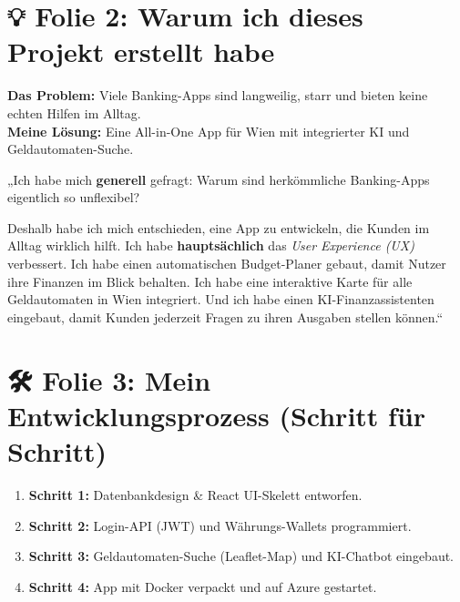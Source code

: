 \documentclass[11pt,a4paper]{article}
\begin{document}
\vspace{1cm}

\section{💡 Folie 2: Warum ich dieses Projekt erstellt habe}

\begin{tcolorbox}[colback=bglight, colframe=slideorange, title=\textbf{\color{white}Visualisierung auf Folie 2}, arc=4pt]
\textbf{Das Problem:} Viele Banking-Apps sind langweilig, starr und bieten keine echten Hilfen im Alltag. \\
\textbf{Meine Lösung:} Eine All-in-One App für Wien mit integrierter KI und Geldautomaten-Suche.
\end{tcolorbox}

\begin{tcolorbox}[colback=white, colframe=primarynavy, title=\textbf{Mein Sprechtext (Ich-Form)}]
„Ich habe mich \textbf{generell} gefragt: Warum sind herkömmliche Banking-Apps eigentlich so unflexibel? 

Deshalb habe ich mich entschieden, eine App zu entwickeln, die Kunden im Alltag wirklich hilft. Ich habe \textbf{hauptsächlich} das \textit{User Experience (UX)} verbessert. Ich habe einen automatischen Budget-Planer gebaut, damit Nutzer ihre Finanzen im Blick behalten. Ich habe eine interaktive Karte für alle Geldautomaten in Wien integriert. Und ich habe einen KI-Finanzassistenten eingebaut, damit Kunden jederzeit Fragen zu ihren Ausgaben stellen können.“
\end{tcolorbox}

\newpage

\section{🛠️ Folie 3: Mein Entwicklungsprozess (Schritt für Schritt)}

\begin{tcolorbox}[colback=bglight, colframe=slidegreen, title=\textbf{\color{white}Visualisierung auf Folie 3}, arc=4pt]
\begin{enumerate}
    \item \textbf{Schritt 1:} Datenbankdesign \& React UI-Skelett entworfen.
    \item \textbf{Schritt 2:} Login-API (JWT) und Währungs-Wallets programmiert.
    \item \textbf{Schritt 3:} Geldautomaten-Suche (Leaflet-Map) und KI-Chatbot eingebaut.
    \item \textbf{Schritt 4:} App mit Docker verpackt und auf Azure gestartet.
\end{enumerate}
\end{tcolorbox}
\end{document}
